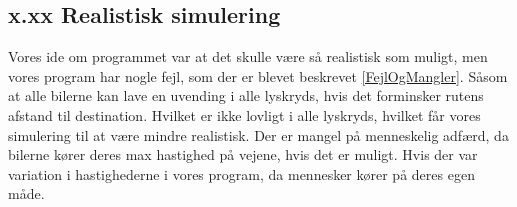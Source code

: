 \subsection{x.xx Realistisk simulering}
Vores ide om programmet var at det skulle være så realistisk som muligt, men vores program har nogle fejl, som der er blevet beskrevet \ref{FejlOgMangler}. Såsom at alle bilerne kan lave en uvending i alle lyskryds, hvis det forminsker rutens afstand til destination. Hvilket er ikke lovligt i alle lyskryds, hvilket får vores simulering til at være mindre realistisk. Der er mangel på menneskelig adfærd, da bilerne kører deres max hastighed på vejene, hvis det er muligt. Hvis der var variation i hastighederne i vores program, da mennesker kører på deres egen måde.


